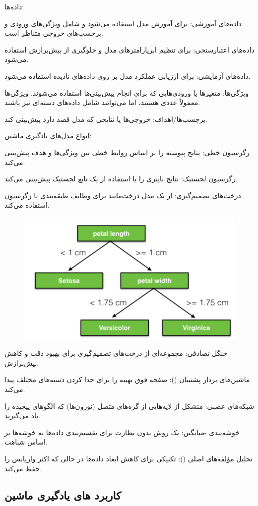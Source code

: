 \documentclass[a4paper, titlepage]{article}
\begin{document}
داده‌ها:

داده‌های آموزشی: برای آموزش مدل استفاده می‌شود و شامل ویژگی‌های ورودی و برچسب‌های خروجی متناظر است.

داده‌های اعتبارسنجی: برای تنظیم ابرپارامترهای مدل و جلوگیری از بیش‌برازش استفاده می‌شود.

داده‌های آزمایشی: برای ارزیابی عملکرد مدل بر روی داده‌های نادیده استفاده می‌شود.

ویژگی‌ها: متغیرها یا ورودی‌هایی که برای انجام پیش‌بینی‌ها استفاده می‌شوند. ویژگی‌ها معمولاً عددی هستند، اما می‌توانند شامل داده‌های دسته‌ای نیز باشند.

برچسب‌ها/اهداف: خروجی‌ها یا نتایجی که مدل قصد دارد پیش‌بینی کند.

انواع مدل‌های یادگیری ماشین:

رگرسیون خطی: نتایج پیوسته را بر اساس روابط خطی بین ویژگی‌ها و هدف پیش‌بینی می‌کند.

رگرسیون لجستیک: نتایج باینری را با استفاده از یک تابع لجستیک پیش‌بینی می‌کند.

درخت‌های تصمیم‌گیری: از یک مدل درخت‌مانند برای وظایف طبقه‌بندی یا رگرسیون استفاده می‌کند.

\begin{figure}
    \centering
    \includegraphics[width=0.5\linewidth]{image_2024-05-27_20-39-48.png}
    \caption{}
    \label{Desicion tree}
\end{figure}

جنگل تصادفی: مجموعه‌ای از درخت‌های تصمیم‌گیری برای بهبود دقت و کاهش بیش‌برازش.

ماشین‌های بردار پشتیبان (): صفحه فوق بهینه را برای جدا کردن دسته‌های مختلف پیدا می‌کند.

شبکه‌های عصبی: متشکل از لایه‌هایی از گره‌های متصل (نورون‌ها) که الگوهای پیچیده را یاد می‌گیرند.

خوشه‌بندی -میانگین: یک روش بدون نظارت برای تقسیم‌بندی داده‌ها به خوشه‌ها بر اساس شباهت.

تحلیل مؤلفه‌های اصلی (): تکنیکی برای کاهش ابعاد داده‌ها در حالی که اکثر واریانس را حفظ می‌کند.

\subsection{کاربرد های یادگیری ماشین}
\end{document}
